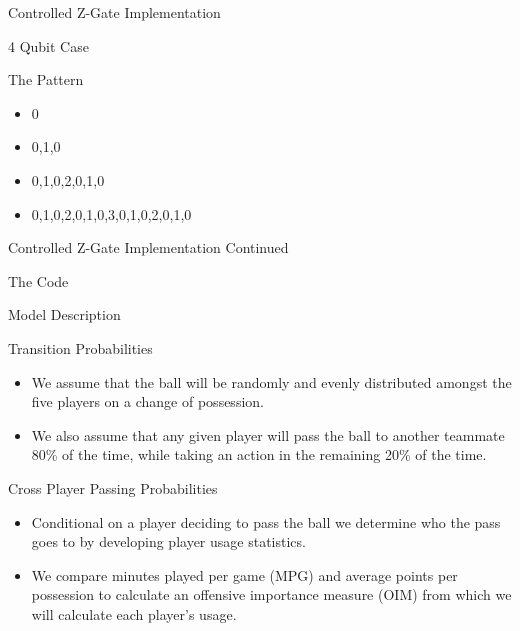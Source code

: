\documentclass{beamer}
\begin{document}
\begin{frame}{Controlled Z-Gate Implementation}

\begin{block}{4 Qubit Case}
\end{block}

\begin{block}{The Pattern}
\begin{itemize}
  \item 0
  \item 0,1,0
  \item 0,1,0,2,0,1,0
  \item 0,1,0,2,0,1,0,3,0,1,0,2,0,1,0
\end{itemize}
\end{block}

\end{frame}


\begin{frame}{Controlled Z-Gate Implementation Continued}
\begin{block}{The Code}
\end{block}
\end{frame}

\begin{frame}{Model Description}
\begin{block}{Transition Probabilities}
\begin{itemize}
    \item We assume that the ball will be randomly and evenly distributed amongst the five players on a change of possession.
    \item We also assume that any given player will pass the ball to another teammate 80\% of the time,  while taking an action in the remaining 20\% of the time.
\end{itemize}
\end{block}
\begin{block}{Cross Player Passing Probabilities}
\begin{itemize}
    \item Conditional on a player deciding to pass the ball we determine who the pass goes to by developing player usage statistics.
    \item We compare minutes played per game (MPG) and average points per possession to calculate an offensive importance measure (OIM) from which we will calculate each player’s usage.
\end{itemize}
\end{block}
\end{frame}
\end{document}
